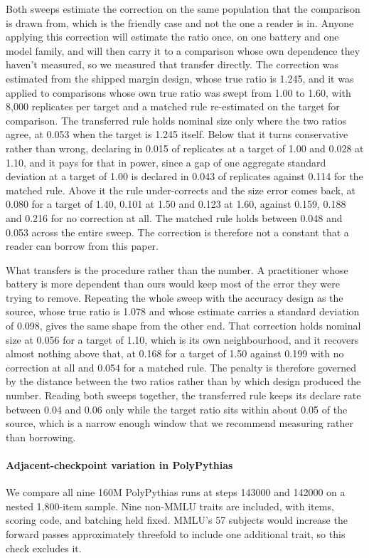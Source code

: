 Both sweeps estimate the correction on the same population that the comparison is drawn from, which is the friendly case and not the one a reader is in. Anyone applying this correction will estimate the ratio once, on one battery and one model family, and will then carry it to a comparison whose own dependence they haven't measured, so we measured that transfer directly. The correction was estimated from the shipped margin design, whose true ratio is 1.245, and it was applied to comparisons whose own true ratio was swept from 1.00 to 1.60, with 8,000 replicates per target and a matched rule re-estimated on the target for comparison. The transferred rule holds nominal size only where the two ratios agree, at 0.053 when the target is 1.245 itself. Below that it turns conservative rather than wrong, declaring in 0.015 of replicates at a target of 1.00 and 0.028 at 1.10, and it pays for that in power, since a gap of one aggregate standard deviation at a target of 1.00 is declared in 0.043 of replicates against 0.114 for the matched rule. Above it the rule under-corrects and the size error comes back, at 0.080 for a target of 1.40, 0.101 at 1.50 and 0.123 at 1.60, against 0.159, 0.188 and 0.216 for no correction at all. The matched rule holds between 0.048 and 0.053 across the entire sweep. The correction is therefore not a constant that a reader can borrow from this paper.

What transfers is the procedure rather than the number. A practitioner whose battery is more dependent than ours would keep most of the error they were trying to remove. Repeating the whole sweep with the accuracy design as the source, whose true ratio is 1.078 and whose estimate carries a standard deviation of 0.098, gives the same shape from the other end. That correction holds nominal size at 0.056 for a target of 1.10, which is its own neighbourhood, and it recovers almost nothing above that, at 0.168 for a target of 1.50 against 0.199 with no correction at all and 0.054 for a matched rule. The penalty is therefore governed by the distance between the two ratios rather than by which design produced the number. Reading both sweeps together, the transferred rule keeps its declare rate between 0.04 and 0.06 only while the target ratio sits within about 0.05 of the source, which is a narrow enough window that we recommend measuring rather than borrowing.

\paragraph{Adjacent-checkpoint variation in PolyPythias}
We compare all nine 160M PolyPythias runs at steps 143000 and 142000 on a nested 1,800-item sample. Nine non-MMLU traits are included, with items, scoring code, and batching held fixed. MMLU's 57 subjects would increase the forward passes approximately threefold to include one additional trait, so this check excludes it.

